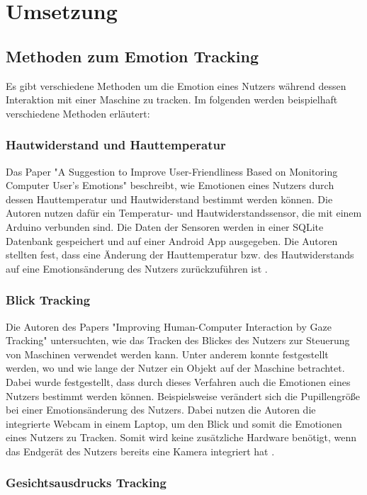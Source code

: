 \section{Umsetzung}
\subsection{Methoden zum Emotion Tracking}
Es gibt verschiedene Methoden um die Emotion eines Nutzers während dessen Interaktion mit einer Maschine zu tracken. Im folgenden werden beispielhaft verschiedene Methoden erläutert:

\subsubsection{Hautwiderstand und Hauttemperatur}
Das Paper "A Suggestion to Improve User-Friendliness Based
on Monitoring Computer User’s Emotions" beschreibt, wie Emotionen eines Nutzers durch dessen Hauttemperatur und Hautwiderstand bestimmt werden können. Die Autoren nutzen dafür ein Temperatur- und Hautwiderstandssensor, die mit einem Arduino verbunden sind. Die Daten der Sensoren werden in einer SQLite Datenbank gespeichert und auf einer Android App ausgegeben. Die Autoren stellten fest, dass eine Änderung der Hauttemperatur bzw. des Hautwiderstands  auf eine Emotionsänderung des Nutzers zurückzuführen ist \cite{EmotionTrackingGSR}.

\subsubsection{Blick Tracking}
Die Autoren des Papers "Improving Human-Computer Interaction
by Gaze Tracking" untersuchten, wie das Tracken des Blickes des Nutzers zur Steuerung von Maschinen verwendet werden kann. Unter anderem konnte festgestellt werden, wo und wie lange der Nutzer ein Objekt auf der Maschine betrachtet. Dabei wurde festgestellt, dass durch dieses Verfahren auch die Emotionen eines Nutzers bestimmt werden können. Beispielsweise verändert sich die Pupillengröße bei einer Emotionsänderung des Nutzers. Dabei nutzen die Autoren die integrierte Webcam in einem Laptop, um den Blick und somit die Emotionen eines Nutzers zu Tracken. Somit wird keine zusätzliche Hardware benötigt, wenn das Endgerät des Nutzers bereits eine Kamera integriert hat \cite{EmotionTrackingGaze}.

\subsubsection{Gesichtsausdrucks Tracking}
